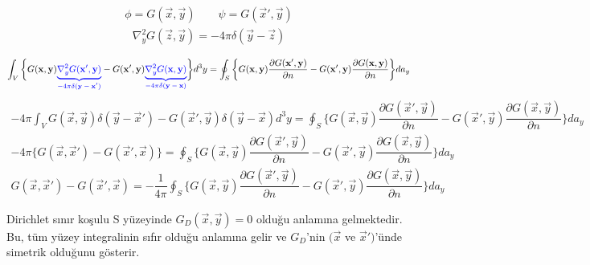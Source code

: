 \begin{tcolorbox}
\begin{align*}
\phi = G ( \Vec{x}, \Vec{y}) \qquad \psi = G ( \vec{x}', \Vec{y})    
\end{align*}
\begin{align*}
\nabla^{2}_{y} G ( \Vec{z}, \Vec{y} ) = - 4 \pi \delta (\Vec{y} - \Vec{z}) 
\end{align*}
\end{tcolorbox}
\begin{align*}
\int_{V} \bigg\{  G (\Vec{x}, \Vec{y}) \begingroup \color{blue}{ \underbrace{\nabla^{2}_{y} G ( \vec{x}', \Vec{y} )}_\text{$-4\pi \delta (\Vec{y} - \vec{x}')$} } \endgroup  - G ( \vec{x}', \Vec{y} ) \begingroup \color{blue}{ \underbrace{\nabla^{2}_{y} G ( \vec{x}, \Vec{y} )}_\text{$-4\pi \delta (\Vec{y} - \vec{x})$} } \endgroup  \bigg\} d^{3} y = \oint_{S} \bigg\{ G ( \Vec{x} , \Vec{y}  ) \dfrac{\partial G (\vec{x}', \Vec{y} )}{\partial n} - G ( \vec{x}', \Vec{y} ) \dfrac{\partial G ( \Vec{x}, \Vec{y} )}{\partial n} \bigg\} da_{y} 
\end{align*}
\begin{align*}
-4 \pi \int_{V} G ( \Vec{x}, \Vec{y}) \delta ( \Vec{y} - \vec{x}') - G ( \vec{x}' , \Vec{y}) \delta ( \Vec{y} - \vec{x}) d^{3} y  = \oint_{S} \bigg\{ G ( \Vec{x} , \Vec{y}  ) \dfrac{\partial G (\vec{x}', \Vec{y} )}{\partial n} - G ( \vec{x}', \Vec{y} ) \dfrac{\partial G ( \Vec{x}, \Vec{y} )}{\partial n} \bigg\} da_{y} 
\end{align*}
\begin{align*}
-4 \pi \bigg\{ G (\Vec{x}, \vec{x}') - G (\vec{x}', \Vec{x} ) \bigg\} = \oint_{S} \bigg\{ G ( \Vec{x} , \Vec{y}  ) \dfrac{\partial G (\vec{x}', \Vec{y} )}{\partial n} - G ( \vec{x}', \Vec{y} ) \dfrac{\partial G ( \Vec{x}, \Vec{y} )}{\partial n} \bigg\} da_{y} 
\end{align*}
\begin{align*}
G (\Vec{x}, \vec{x}') - G (\vec{x}', \Vec{x} ) = - \dfrac{1}{4 \pi} \oint_{S} \bigg\{ G ( \Vec{x} , \Vec{y}  ) \dfrac{\partial G (\vec{x}', \Vec{y} )}{\partial n} - G ( \vec{x}', \Vec{y} ) \dfrac{\partial G ( \Vec{x}, \Vec{y} )}{\partial n} \bigg\} da_{y} 
\end{align*}

\newpage


Dirichlet sınır koşulu S yüzeyinde $G_{D} (\Vec{x}, \Vec{y}) = 0$ olduğu anlamına gelmektedir. Bu, tüm yüzey integralinin sıfır olduğu anlamına gelir ve $G_{D}$'nin $(\Vec{x}$ ve $\vec{x}')$'ünde simetrik olduğunu gösterir.

